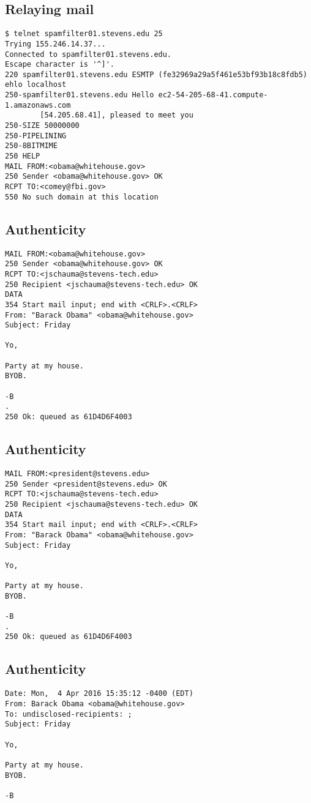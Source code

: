 \documentclass[xga]{xdvislides}
\begin{document}
\subsection{Relaying mail}
\begin{verbatim}
$ telnet spamfilter01.stevens.edu 25
Trying 155.246.14.37...
Connected to spamfilter01.stevens.edu.
Escape character is '^]'.
220 spamfilter01.stevens.edu ESMTP (fe32969a29a5f461e53bf93b18c8fdb5)
ehlo localhost
250-spamfilter01.stevens.edu Hello ec2-54-205-68-41.compute-1.amazonaws.com
        [54.205.68.41], pleased to meet you
250-SIZE 50000000
250-PIPELINING
250-8BITMIME
250 HELP
MAIL FROM:<obama@whitehouse.gov>
250 Sender <obama@whitehouse.gov> OK
RCPT TO:<comey@fbi.gov>
550 No such domain at this location
\end{verbatim}

\subsection{Authenticity}
\begin{verbatim}
MAIL FROM:<obama@whitehouse.gov>
250 Sender <obama@whitehouse.gov> OK
RCPT TO:<jschauma@stevens-tech.edu>
250 Recipient <jschauma@stevens-tech.edu> OK
DATA
354 Start mail input; end with <CRLF>.<CRLF>
From: "Barack Obama" <obama@whitehouse.gov>
Subject: Friday

Yo,

Party at my house.
BYOB.

-B
.
250 Ok: queued as 61D4D6F4003
\end{verbatim}

\subsection{Authenticity}
\begin{verbatim}
MAIL FROM:<president@stevens.edu>
250 Sender <president@stevens.edu> OK
RCPT TO:<jschauma@stevens-tech.edu>
250 Recipient <jschauma@stevens-tech.edu> OK
DATA
354 Start mail input; end with <CRLF>.<CRLF>
From: "Barack Obama" <obama@whitehouse.gov>
Subject: Friday

Yo,

Party at my house.
BYOB.

-B
.
250 Ok: queued as 61D4D6F4003
\end{verbatim}

\subsection{Authenticity}
\begin{verbatim}
Date: Mon,  4 Apr 2016 15:35:12 -0400 (EDT)
From: Barack Obama <obama@whitehouse.gov>
To: undisclosed-recipients: ;
Subject: Friday

Yo,

Party at my house.
BYOB.

-B
\end{verbatim}
\end{document}
